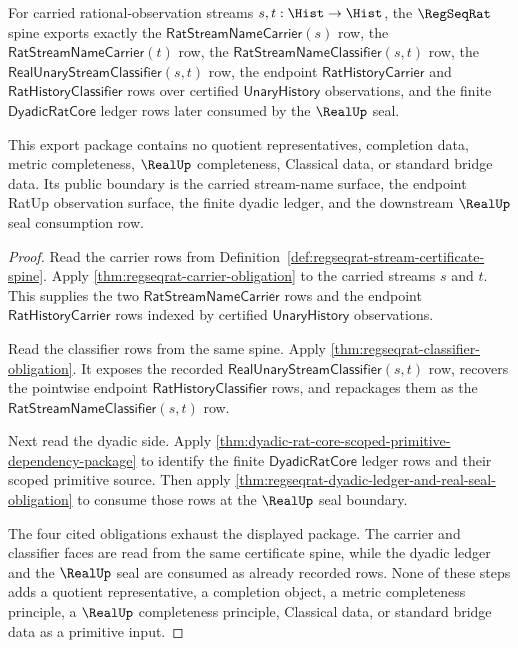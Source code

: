 \begin{theorem}
\label{thm:regseqrat-carrier-classifier-export-package}
For carried rational-observation streams $s,t:\Hist\to\Hist$, the
$\RegSeqRat$ spine exports exactly the
$\mathsf{RatStreamNameCarrier}(s)$ row, the
$\mathsf{RatStreamNameCarrier}(t)$ row, the
$\mathsf{RatStreamNameClassifier}(s,t)$ row, the
$\mathsf{RealUnaryStreamClassifier}(s,t)$ row, the endpoint
$\mathsf{RatHistoryCarrier}$ and $\mathsf{RatHistoryClassifier}$ rows over
certified $\mathsf{UnaryHistory}$ observations, and the finite
$\mathsf{DyadicRatCore}$ ledger rows later consumed by the $\RealUp$ seal.

This export package contains no quotient representatives, completion data,
metric completeness, $\RealUp$ completeness, Classical data, or standard
bridge data. Its public boundary is the carried stream-name surface, the
endpoint RatUp observation surface, the finite dyadic ledger, and the
downstream $\RealUp$ seal consumption row.
\end{theorem}
\begin{proof}
Read the carrier rows from Definition~\ref{def:regseqrat-stream-certificate-spine}.
Apply \autoref{thm:regseqrat-carrier-obligation} to the carried streams $s$
and $t$. This supplies the two $\mathsf{RatStreamNameCarrier}$ rows and the
endpoint $\mathsf{RatHistoryCarrier}$ rows indexed by certified
$\mathsf{UnaryHistory}$ observations.

Read the classifier rows from the same spine. Apply
\autoref{thm:regseqrat-classifier-obligation}. It exposes the recorded
$\mathsf{RealUnaryStreamClassifier}(s,t)$ row, recovers the pointwise endpoint
$\mathsf{RatHistoryClassifier}$ rows, and repackages them as the
$\mathsf{RatStreamNameClassifier}(s,t)$ row.

Next read the dyadic side. Apply
\autoref{thm:dyadic-rat-core-scoped-primitive-dependency-package} to identify
the finite $\mathsf{DyadicRatCore}$ ledger rows and their scoped primitive
source. Then apply
\autoref{thm:regseqrat-dyadic-ledger-and-real-seal-obligation} to consume
those rows at the $\RealUp$ seal boundary.

The four cited obligations exhaust the displayed package. The carrier and
classifier faces are read from the same certificate spine, while the dyadic
ledger and the $\RealUp$ seal are consumed as already recorded rows. None of
these steps adds a quotient representative, a completion object, a metric
completeness principle, a $\RealUp$ completeness principle, Classical data, or
standard bridge data as a primitive input.
\end{proof}

